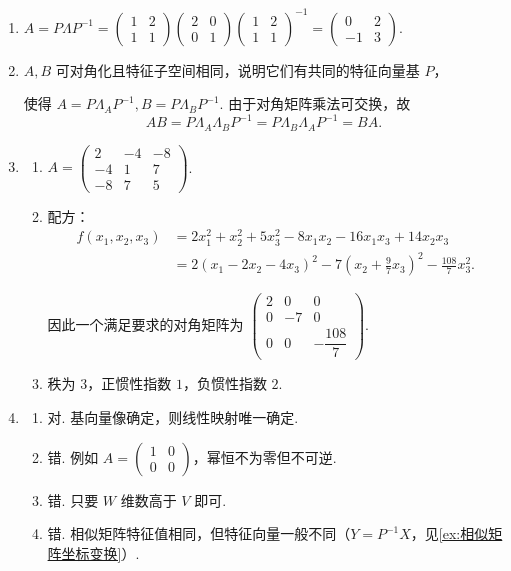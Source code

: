 \begin{enumerate}
    \item $A = P \Lambda P^{-1} = \begin{pmatrix} 1 & 2 \\ 1 & 1 \end{pmatrix} \begin{pmatrix} 2 & 0 \\ 0 & 1 \end{pmatrix} \begin{pmatrix} 1 & 2 \\ 1 & 1 \end{pmatrix}^{-1} = \begin{pmatrix} 0 & 2 \\ -1 & 3 \end{pmatrix}$.

    \item $A, B$ 可对角化且特征子空间相同，说明它们有共同的特征向量基 $P$，

    使得 $A=P\Lambda_A P^{-1}, B=P\Lambda_B P^{-1}$. 由于对角矩阵乘法可交换，故 \[ AB = P \Lambda_A \Lambda_B P^{-1} = P \Lambda_B \Lambda_A P^{-1} = BA. \]

    \item
    \begin{enumerate}
        \item $A = \begin{pmatrix} 2 & -4 & -8 \\ -4 & 1 & 7 \\ -8 & 7 & 5 \end{pmatrix}$.
        \item 配方：\begin{align*}
            f(x_1,x_2,x_3) &= 2x_1^2 + x_2^2 + 5x_3^2 - 8x_1x_2 -16x_1x_3 + 14x_2x_3 \\
            &= 2(x_1-2x_2-4x_3)^2 - 7(x_2+\frac{9}{7}x_3)^2 - \frac{108}{7} x_3^2.
        \end{align*}

        因此一个满足要求的对角矩阵为 $\begin{pmatrix} 2 & 0 & 0 \\ 0 & -7 & 0 \\ 0 & 0 & -\dfrac{108}{7} \end{pmatrix}$.
        \item 秩为 $3$，正惯性指数 $1$，负惯性指数 $2$.
    \end{enumerate}

    \item
    \begin{enumerate}
        \item 对. 基向量像确定，则线性映射唯一确定.
        \item 错. 例如 $A = \begin{pmatrix} 1 & 0 \\ 0 & 0 \end{pmatrix}$，幂恒不为零但不可逆.
        \item 错. 只要 $W$ 维数高于 $V$ 即可.
        \item 错. 相似矩阵特征值相同，但特征向量一般不同（$Y=P^{-1}X$，见\autoref{ex:相似矩阵坐标变换}）.
    \end{enumerate}
\end{enumerate}

\clearpage
